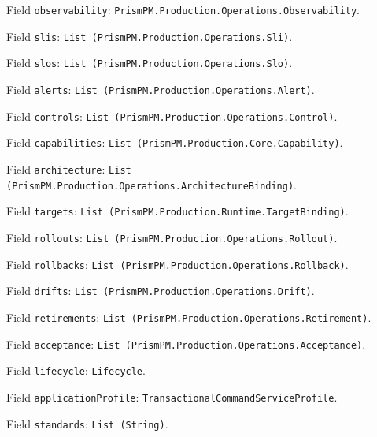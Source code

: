 \documentclass[11pt]{article}
\begin{document}
\noindent Field \texttt{observability}: \texttt{PrismPM.Production.Operations.Observability}.\par
\noindent Field \texttt{slis}: \texttt{List (PrismPM.Production.Operations.Sli)}.\par
\noindent Field \texttt{slos}: \texttt{List (PrismPM.Production.Operations.Slo)}.\par
\noindent Field \texttt{alerts}: \texttt{List (PrismPM.Production.Operations.Alert)}.\par
\noindent Field \texttt{controls}: \texttt{List (PrismPM.Production.Operations.Control)}.\par
\noindent Field \texttt{capabilities}: \texttt{List (PrismPM.Production.Core.Capability)}.\par
\noindent Field \texttt{architecture}: \texttt{List (PrismPM.Production.Operations.ArchitectureBinding)}.\par
\noindent Field \texttt{targets}: \texttt{List (PrismPM.Production.Runtime.TargetBinding)}.\par
\noindent Field \texttt{rollouts}: \texttt{List (PrismPM.Production.Operations.Rollout)}.\par
\noindent Field \texttt{rollbacks}: \texttt{List (PrismPM.Production.Operations.Rollback)}.\par
\noindent Field \texttt{drifts}: \texttt{List (PrismPM.Production.Operations.Drift)}.\par
\noindent Field \texttt{retirements}: \texttt{List (PrismPM.Production.Operations.Retirement)}.\par
\noindent Field \texttt{acceptance}: \texttt{List (PrismPM.Production.Operations.Acceptance)}.\par
\noindent Field \texttt{lifecycle}: \texttt{Lifecycle}.\par
\noindent Field \texttt{applicationProfile}: \texttt{TransactionalCommandServiceProfile}.\par
\noindent Field \texttt{standards}: \texttt{List (String)}.\par
\end{document}
